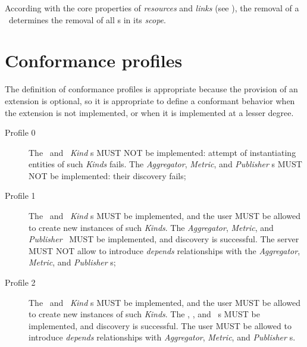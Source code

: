 \documentclass[10pt,a4paper]{article}
\begin{document}
According with the core properties of {\em resources} and {\em links} (see \cite{occi:core}), the removal of a \sens\ determines the removal of all \coll s in its {\em scope}.

\section{Conformance profiles}

The definition of conformance profiles is appropriate because the provision of an extension is optional, so it is appropriate to define a conformant behavior when the extension is not implemented, or when it is implemented at a lesser degree. 

\begin{description}

\item[Profile 0] The \coll\ and \sens\ {\em Kind} s MUST NOT be implemented: attempt of instantiating entities of such {\em Kinds} fails. The {\em Aggregator}, {\em Metric}, and {\em Publisher} \mi s MUST NOT be implemented: their discovery fails;

\item[Profile 1] The \coll\ and \sens\ {\em Kind} s MUST be implemented, and the user MUST be allowed to create new instances of such {\em Kinds}. The {\em Aggregator}, {\em Metric}, and {\em Publisher} \mi\ MUST be implemented, and discovery is successful. The server MUST NOT allow to introduce {\em depends} relationships with the {\em Aggregator}, {\em Metric}, and {\em Publisher} \mi s; 

\item[Profile 2]  The \coll\ and \sens\ {\em Kind} s MUST be implemented, and the user MUST be allowed to create new instances of such {\em Kinds}. The \aggr , \metr , and \publ\ \mi s MUST be implemented, and discovery is successful. The user MUST be allowed to introduce {\em depends} relationships with  {\em Aggregator}, {\em Metric}, and {\em Publisher} \mi s.

\end{description}
\end{document}
